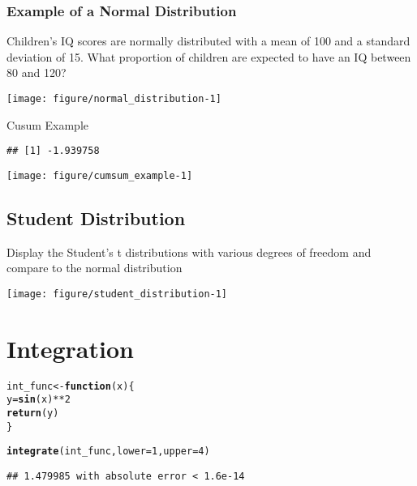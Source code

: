 \documentclass[a4paper,10pt]{book}\usepackage[]{graphicx}\usepackage[]{color}
\makeatletter
\def\maxwidth{ %
  \ifdim\Gin@nat@width>\linewidth
    \linewidth
  \else
    \Gin@nat@width
  \fi
}
\newcommand{\hlnum}[1]{\textcolor[rgb]{0.686,0.059,0.569}{#1}}%
\newcommand{\hlopt}[1]{\textcolor[rgb]{0,0,0}{#1}}%
\newcommand{\hlstd}[1]{\textcolor[rgb]{0.345,0.345,0.345}{#1}}%
\newcommand{\hlkwa}[1]{\textcolor[rgb]{0.161,0.373,0.58}{\textbf{#1}}}%
\newcommand{\hlkwb}[1]{\textcolor[rgb]{0.69,0.353,0.396}{#1}}%
\newcommand{\hlkwc}[1]{\textcolor[rgb]{0.333,0.667,0.333}{#1}}%
\newcommand{\hlkwd}[1]{\textcolor[rgb]{0.737,0.353,0.396}{\textbf{#1}}}%
\newenvironment{kframe}{%
 \def\at@end@of@kframe{}%
 \ifinner\ifhmode%
  \def\at@end@of@kframe{\end{minipage}}%
  \begin{minipage}{\columnwidth}%
 \fi\fi%
 \def\FrameCommand##1{\hskip\@totalleftmargin \hskip-\fboxsep
 \colorbox{shadecolor}{##1}\hskip-\fboxsep
     \hskip-\linewidth \hskip-\@totalleftmargin \hskip\columnwidth}%
 \MakeFramed {\advance\hsize-\width
   \@totalleftmargin\z@ \linewidth\hsize
   \@setminipage}}%
 {\par\unskip\endMakeFramed%
 \at@end@of@kframe}
\newenvironment{knitrout}{}{} %
\makeatother
\begin{document}
\subsubsection*{Example of a Normal Distribution}

Children's IQ scores are normally distributed with a
mean of 100 and a standard deviation of 15. What
proportion of children are expected to have an IQ between
80 and 120?

\begin{knitrout}
\color{fgcolor}
\texttt{[image: figure/normal\_distribution-1]} 

\end{knitrout}


Cusum Example 

\begin{knitrout}
\color{fgcolor}\begin{kframe}
\begin{verbatim}
## [1] -1.939758
\end{verbatim}
\end{kframe}
\texttt{[image: figure/cumsum\_example-1]} 

\end{knitrout}

\subsection*{Student Distribution}

Display the Student's t distributions with various
degrees of freedom and compare to the normal distribution

\begin{knitrout}
\color{fgcolor}
\texttt{[image: figure/student\_distribution-1]} 

\end{knitrout}

\section{Integration}

\begin{knitrout}
\color{fgcolor}\begin{kframe}
\begin{alltt}
\hlstd{int_func} \hlkwb{<-} \hlkwa{function}\hlstd{(}\hlkwc{x}\hlstd{) \{}
  \hlstd{y} \hlkwb{=} \hlkwd{sin}\hlstd{(x)} \hlopt{**} \hlnum{2}
  \hlkwd{return}\hlstd{(y)}
\hlstd{\}}

\hlkwd{integrate}\hlstd{(int_func,} \hlkwc{lower}\hlstd{=}\hlnum{1} \hlstd{,} \hlkwc{upper}\hlstd{=}\hlnum{4}\hlstd{)}
\end{alltt}
\begin{verbatim}
## 1.479985 with absolute error < 1.6e-14
\end{verbatim}
\end{kframe}
\end{knitrout}
\end{document}
